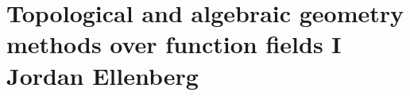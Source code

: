 \chapter{Topological and algebraic geometry methods over function fields I \\ Jordan Ellenberg}\label{ch:35}